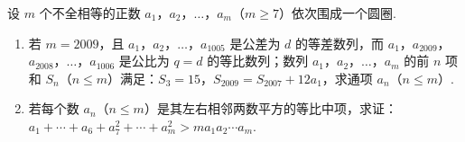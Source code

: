 \begin{problem}
设 \(m\) 个不全相等的正数 \(a_1\)，\(a_2\)，\(\ldots\)，\(a_m\)（\(m\geqslant 7\)）依次围成一个圆圈.

\begin{enumerate}
\item 若 \(m=2009\)，且 \(a_1\)，\(a_2\)，\(\ldots\)，\(a_{1005}\) 是公差为 \(d\) 的等差数列，而 \(a_1\)，\(a_{2009}\)，\(a_{2008}\)，\(\ldots\)，\(a_{1006}\) 是公比为 \(q=d\) 的等比数列；数列 \(a_1\)，\(a_2\)，\(\ldots\)，\(a_m\) 的前 \(n\) 项和 \(S_n\)（\(n\leqslant m\)）满足：\(S_3=15\)，\(S_{2009}=S_{2007}+12a_1\)，求通项 \(a_n\)（\(n\leqslant m\)）.
\item 若每个数 \(a_n\)（\(n\leqslant m\)）是其左右相邻两数平方的等比中项，求证：\(a_1+\cdots+a_6+a_7^2+\cdots+a_m^2>ma_1a_2\cdots a_m\).
\end{enumerate}
\end{problem}

